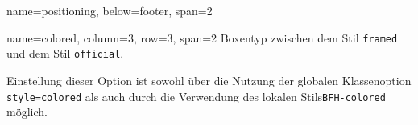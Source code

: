 \documentclass[
	paper=a0,%
	style=ruled, %
	]{bfhsciposter}
\let\code\texttt
\let\pck\textsf
\begin{document}
\begin{tcbposter}[
		poster={
				columns=4,
				rows=7,
				spacing=1cm,
			},]
\begin{posterboxenv}[title=C++ Review Dune meets Arch4edu]{name=positioning, below=footer, span=2}

	\end{posterboxenv}

	\begin{posterboxenv}[title=A BFH-colored style box, BFH-colored]{name=colored, column=3, row=3, span=2}
		Boxentyp zwischen dem Stil \code{framed} und dem Stil \code{official}.

		Einstellung dieser Option ist sowohl über die Nutzung der globalen Klassenoption \code{style=colored} als auch durch die Verwendung des lokalen Stils\code{BFH-colored} möglich.

	\end{posterboxenv}





\end{tcbposter}
\end{document}
